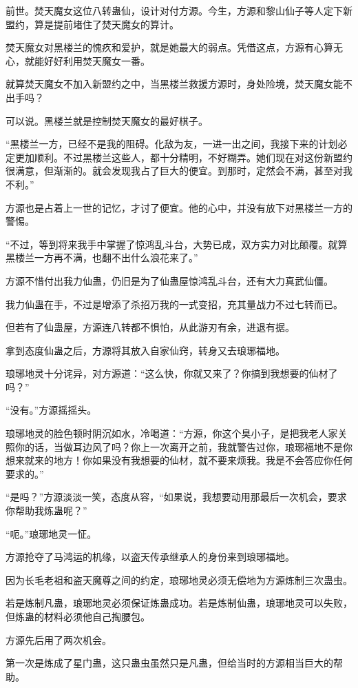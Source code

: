 \begin{this_body}
前世。焚天魔女这位八转蛊仙，设计对付方源。今生，方源和黎山仙子等人定下新盟约，算是提前堵住了焚天魔女的算计。

焚天魔女对黑楼兰的愧疚和爱护，就是她最大的弱点。凭借这点，方源有心算无心，就能好好利用焚天魔女一番。

就算焚天魔女不加入新盟约之中，当黑楼兰救援方源时，身处险境，焚天魔女能不出手吗？

可以说。黑楼兰就是控制焚天魔女的最好棋子。

“黑楼兰一方，已经不是我的阻碍。化敌为友，一进一出之间，我接下来的计划必定更加顺利。不过黑楼兰这些人，都十分精明，不好糊弄。她们现在对这份新盟约很满意，但渐渐的。就会发现我占了巨大的便宜。到那时，定然会不满，甚至对我不利。”

方源也是占着上一世的记忆，才讨了便宜。他的心中，并没有放下对黑楼兰一方的警惕。

“不过，等到将来我手中掌握了惊鸿乱斗台，大势已成，双方实力对比颠覆。就算黑楼兰一方再不满，也翻不出什么浪花来了。”

方源不惜付出我力仙蛊，仍旧是为了仙蛊屋惊鸿乱斗台，还有大力真武仙僵。

我力仙蛊在手，不过是增添了杀招万我的一式变招，充其量战力不过七转而已。

但若有了仙蛊屋，方源连八转都不惧怕，从此游刃有余，进退有据。

拿到态度仙蛊之后，方源将其放入自家仙窍，转身又去琅琊福地。

琅琊地灵十分诧异，对方源道：“这么快，你就又来了？你搞到我想要的仙材了吗？”

“没有。”方源摇摇头。

琅琊地灵的脸色顿时阴沉如水，冷喝道：“方源，你这个臭小子，是把我老人家关照你的话，当做耳边风了吗？你上一次离开之前，我就警告过你，琅琊福地不是你想来就来的地方！你如果没有我想要的仙材，就不要来烦我。我是不会答应你任何要求的。”

“是吗？”方源淡淡一笑，态度从容，“如果说，我想要动用那最后一次机会，要求你帮助我炼蛊呢？”

“呃。”琅琊地灵一怔。

方源抢夺了马鸿运的机缘，以盗天传承继承人的身份来到琅琊福地。

因为长毛老祖和盗天魔尊之间的约定，琅琊地灵必须无偿地为方源炼制三次蛊虫。

若是炼制凡蛊，琅琊地灵必须保证炼蛊成功。若是炼制仙蛊，琅琊地灵可以失败，但炼蛊的材料必须他自己掏腰包。

方源先后用了两次机会。

第一次是炼成了星门蛊，这只蛊虫虽然只是凡蛊，但给当时的方源相当巨大的帮助。


\end{this_body}
